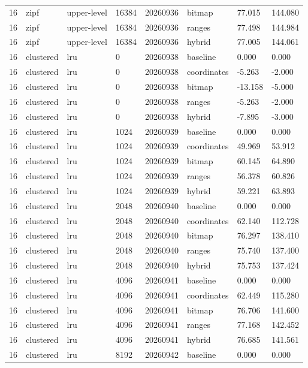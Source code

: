 \begin{tabular}{llllllll}
16 & zipf & upper-level & 16384 & 20260936 & bitmap & 77.015 & 144.080 \\
16 & zipf & upper-level & 16384 & 20260936 & ranges & 77.498 & 144.984 \\
16 & zipf & upper-level & 16384 & 20260936 & hybrid & 77.005 & 144.061 \\
16 & clustered & lru & 0 & 20260938 & baseline & 0.000 & 0.000 \\
16 & clustered & lru & 0 & 20260938 & coordinates & -5.263 & -2.000 \\
16 & clustered & lru & 0 & 20260938 & bitmap & -13.158 & -5.000 \\
16 & clustered & lru & 0 & 20260938 & ranges & -5.263 & -2.000 \\
16 & clustered & lru & 0 & 20260938 & hybrid & -7.895 & -3.000 \\
16 & clustered & lru & 1024 & 20260939 & baseline & 0.000 & 0.000 \\
16 & clustered & lru & 1024 & 20260939 & coordinates & 49.969 & 53.912 \\
16 & clustered & lru & 1024 & 20260939 & bitmap & 60.145 & 64.890 \\
16 & clustered & lru & 1024 & 20260939 & ranges & 56.378 & 60.826 \\
16 & clustered & lru & 1024 & 20260939 & hybrid & 59.221 & 63.893 \\
16 & clustered & lru & 2048 & 20260940 & baseline & 0.000 & 0.000 \\
16 & clustered & lru & 2048 & 20260940 & coordinates & 62.140 & 112.728 \\
16 & clustered & lru & 2048 & 20260940 & bitmap & 76.297 & 138.410 \\
16 & clustered & lru & 2048 & 20260940 & ranges & 75.740 & 137.400 \\
16 & clustered & lru & 2048 & 20260940 & hybrid & 75.753 & 137.424 \\
16 & clustered & lru & 4096 & 20260941 & baseline & 0.000 & 0.000 \\
16 & clustered & lru & 4096 & 20260941 & coordinates & 62.449 & 115.280 \\
16 & clustered & lru & 4096 & 20260941 & bitmap & 76.706 & 141.600 \\
16 & clustered & lru & 4096 & 20260941 & ranges & 77.168 & 142.452 \\
16 & clustered & lru & 4096 & 20260941 & hybrid & 76.685 & 141.561 \\
16 & clustered & lru & 8192 & 20260942 & baseline & 0.000 & 0.000 \\

\end{tabular}

